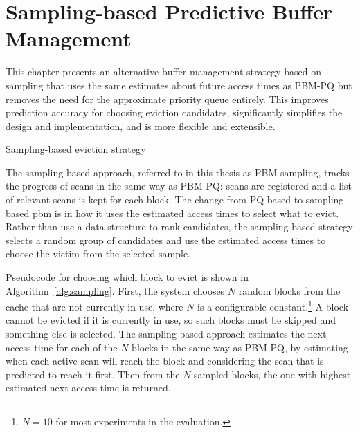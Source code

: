 
\chapter{Sampling-based Predictive Buffer Management}
\label{sec:PBM-sampling}

This chapter presents an alternative buffer management strategy based on sampling that uses the same estimates about future access times as PBM-PQ but removes the need for the approximate priority queue entirely. This improves prediction accuracy for choosing eviction candidates, significantly simplifies the design and implementation, and is more flexible and extensible.

\begin{algorithm}
\SetAlgoLined
\DontPrintSemicolon
{}

\;

\;
\caption{Sampling-based eviction strategy}
\label{alg:sampling}
\end{algorithm}

The sampling-based approach, referred to in this thesis as PBM-sampling, tracks the progress of scans in the same way as PBM-PQ: scans are registered and a list of relevant scans is kept for each block. The change from PQ-based to sampling-based \gls{pbm} is in how it uses the estimated access times to select what to evict. Rather than use a data structure to rank candidates, the sampling-based strategy selects a random group of candidates and use the estimated access times to choose the victim from the selected sample.

Pseudocode for choosing which block to evict is shown in Algorithm~\ref{alg:sampling}. First, the system chooses $N$ random blocks from the cache that are not currently in use, where $N$ is a configurable constant.\footnote{$N=10$ for most experiments in the evaluation.} A block cannot be evicted if it is currently in use, so such blocks must be skipped and something else is selected. The sampling-based approach estimates the next access time for each of the $N$ blocks in the same way as PBM-PQ, by estimating when each active scan will reach the block and considering the scan that is predicted to reach it first. Then from the $N$ sampled blocks, the one with highest estimated next-access-time is returned.

